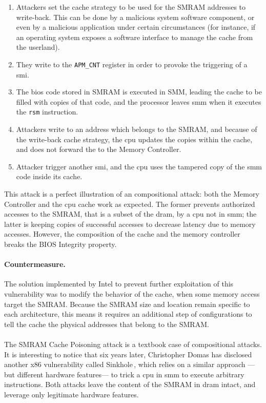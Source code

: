 \begin{enumerate}
\item Attackers set the cache strategy to be used for the SMRAM addresses to
  write-back.
  This can be done by a malicious system software component, or even by a
  malicious application under certain circumstances (for instance, if an
  operating system exposes a software interface to manage the cache from the
  userland).

%
\item They write to the \texttt{APM\_CNT} register in order to provoke the
  triggering of a \ac{smi}.
%
\item The \ac{bios} code stored in SMRAM is executed in SMM, leading the cache
  to be filled with copies of that code, and the processor leaves \ac{smm} when
  it executes the \texttt{rsm} instruction.
%
\item Attackers write to an address which belongs to the SMRAM, and because of
  the write-back cache strategy, the \ac{cpu} updates the copies within the
  cache, and does not forward the \IO to the Memory Controller.
%
\item Attacker trigger another \ac{smi}, and the \ac{cpu} uses the tampered copy
  of the \ac{smm} code inside its cache.
\end{enumerate}
%
This attack is a perfect illustration of an compositional attack:
%
both the Memory Controller and the \ac{cpu} cache work as expected.
%
The former prevents authorized accesses to the SMRAM, that is a subset of the
\ac{dram}, by a \ac{cpu} not in \ac{smm};
%
the latter is keeping copies of successful accesses to decrease latency due to
memory accesses.
%
However, the composition of the cache and the memory controller breaks the BIOS
Integrity property.

\paragraph{Countermeasure.}
%
The solution implemented by Intel to prevent further exploitation of this
vulnerability was to modify the behavior of the cache, when some memory access
target the SMRAM.
%
Because the SMRAM size and location remain specific to each architecture, this
means it requires an additional step of configurations to tell the cache the
physical addresses that belong to the SMRAM.

\paragraph{}
%
The SMRAM Cache Poisoning attack is a textbook case of compositional attacks.
%
It is interesting to notice that six years later, Christopher Domas has
disclosed another x86 vulnerability called Sinkhole\,\cite{domas2015sinkhole},
which relies on a similar approach ---but different hardware features--- to trick a \ac{cpu} in \ac{smm} to execute
arbitrary instructions.
%
Both attacks leave the content of the SMRAM in \ac{dram} intact, and leverage
only legitimate hardware features.

